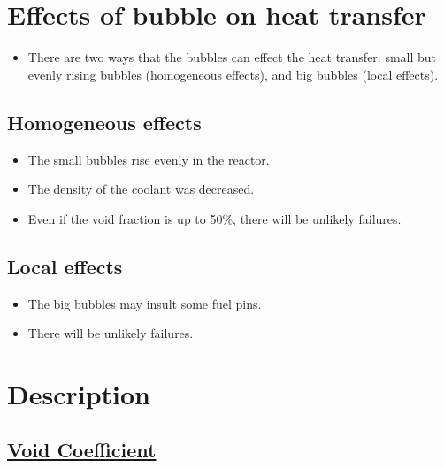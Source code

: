 \documentclass[11pt]{article}
\begin{document}
\section{Effects of bubble on heat transfer}
\label{sec:orge8bb699}
\begin{itemize}
\item There are two ways that the bubbles can effect the heat transfer: small but evenly rising bubbles (homogeneous effects), and big bubbles (local effects).
\end{itemize}
\subsection{Homogeneous effects}
\label{sec:orgba9fd10}
\begin{itemize}
\item The small bubbles rise evenly in the reactor.
\item The density of the coolant was decreased.
\item Even if the void fraction is up to 50\%, there will be unlikely failures.
\end{itemize}
\subsection{Local effects}
\label{sec:org61fe6e1}
\begin{itemize}
\item The big bubbles may insult some fuel pins.
\item There will be unlikely failures.
\end{itemize}
\section{Description}
\label{sec:org8814000}
\subsection{\href{20240215133801-void_coefficient.org}{Void Coefficient}}
\label{sec:org3be165a}
\end{document}

